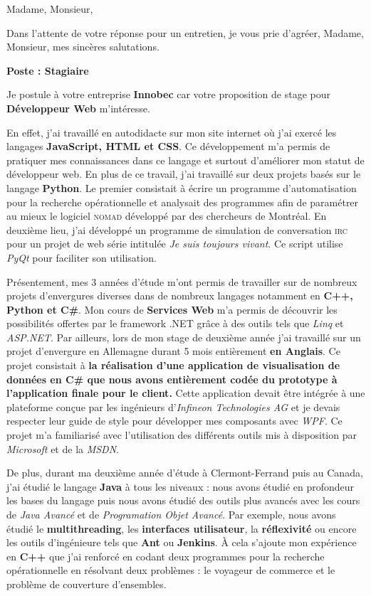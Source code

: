 \date{\today}
\opening{Madame, Monsieur,}
\closing{Dans l'attente de votre réponse pour un entretien, je vous prie d'agréer, Madame, Monsieur, mes sincères salutations.}

\makelettertitle

\textbf{Poste : Stagiaire}

\introduction{}
Je postule à votre entreprise \textbf{Innobec} car votre proposition de stage pour \textbf{Développeur Web} m'intéresse.

En effet, j'ai travaillé en autodidacte sur mon site internet où j'ai exercé les langages \textbf{JavaScript, HTML et CSS}. Ce développement m'a permis de pratiquer mes connaissances dans ce langage et surtout d'améliorer mon statut de développeur web. En plus de ce travail, j'ai travaillé sur deux projets basés sur le langage \textbf{Python}. Le premier consistait à écrire un programme d'automatisation pour la recherche opérationnelle et analysait des programmes afin de paramétrer au mieux le logiciel \textsc{nomad} développé par des chercheurs de Montréal. En deuxième lieu, j'ai développé un programme de simulation de conversation \textsc{irc} pour un projet de web série intitulée \textit{Je suis toujours vivant}. Ce script utilise \textit{PyQt} pour faciliter son utilisation.

Présentement, mes 3 années d'étude m'ont permis de travailler sur de nombreux projets d'envergures diverses dans de nombreux langages notamment en \textbf{C++, Python et C\#}. Mon cours de \textbf{Services Web} m'a permis de découvrir les possibilités offertes par le framework .NET grâce à des outils tels que \textit{Linq} et \textit{ASP.NET}. Par ailleurs, lors de mon stage de deuxième année j'ai travaillé sur un projet d'envergure en Allemagne durant 5 mois entièrement \textbf{en Anglais}. Ce projet consistait à \textbf{la réalisation d'une application de visualisation de données en C\# que nous avons entièrement codée du prototype à l'application finale pour le client.} Cette application devait être intégrée à une plateforme conçue par les ingénieurs d'\textit{Infineon Technologies AG} et je devais respecter leur guide de style pour développer mes composants avec \textit{WPF}. Ce projet m'a familiarisé avec l'utilisation des différents outils mis à disposition par \textit{Microsoft} et de la \textit{MSDN}.

De plus, durant ma deuxième année d'étude à Clermont-Ferrand puis au Canada, j'ai étudié le langage \textbf{Java} à tous les niveaux : nous avons étudié en profondeur les bases du langage puis nous avons étudié des outils plus avancés avec les cours de \textit{Java Avancé} et de \textit{Programation Objet Avancé}. Par exemple, nous avons étudié le \textbf{multithreading}, les \textbf{interfaces utilisateur}, la \textbf{réflexivité} ou encore les outils d'ingénieure tels que \textbf{Ant} ou \textbf{Jenkins}. À cela s'ajoute mon expérience en \textbf{C++} que j'ai renforcé en codant deux programmes pour la recherche opérationnelle en résolvant deux problèmes : le voyageur de commerce et le problème de couverture d'ensembles. \conclusion{}

\makeletterclosing
